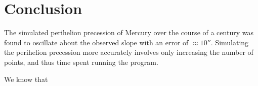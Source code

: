 \documentclass[../main.tex]{subfiles}
\begin{document}
\section{Conclusion}\label{sec:conclusion}


The simulated perihelion precession of Mercury over the course of a century was found to oscillate about the observed slope with an error of $\approx 10''$. Simulating the perihelion precession more accurately involves only increasing the number of points, and thus time spent running the program. 


We know that 

\end{document}
